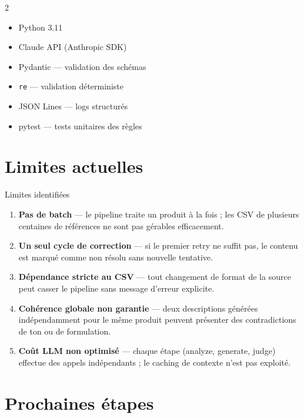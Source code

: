 \documentclass[11pt,a4paper]{article}
\begin{document}
\begin{multicols}{2}
\begin{itemize}[leftmargin=1em, itemsep=2pt]
  \item Python 3.11
  \item Claude API (Anthropic SDK)
  \item Pydantic — validation des schémas
  \item \texttt{re} — validation déterministe
  \item JSON Lines — logs structurés
  \item pytest — tests unitaires des règles
\end{itemize}
\end{multicols}

\section{Limites actuelles}

\begin{warnbox}{Limites identifiées}
\begin{enumerate}[leftmargin=1.5em, itemsep=4pt]
  \item \textbf{Pas de batch} — le pipeline traite un produit à la fois ;
        les CSV de plusieurs centaines de références ne sont pas gérables efficacement.
  \item \textbf{Un seul cycle de correction} — si le premier retry ne suffit pas,
        le contenu est marqué comme non résolu sans nouvelle tentative.
  \item \textbf{Dépendance stricte au CSV} — tout changement de format de la source
        peut casser le pipeline sans message d'erreur explicite.
  \item \textbf{Cohérence globale non garantie} — deux descriptions générées
        indépendamment pour le même produit peuvent présenter des contradictions
        de ton ou de formulation.
  \item \textbf{Coût LLM non optimisé} — chaque étape (analyze, generate, judge)
        effectue des appels indépendants ; le caching de contexte n'est pas exploité.
\end{enumerate}
\end{warnbox}

\section{Prochaines étapes}
\end{document}
